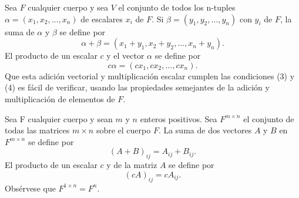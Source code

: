 \begin{ejem}
    Sea $F$ cualquier cuerpo y sea $V$ el conjunto de todos los n-tuples $\alpha=(x_1,x_2,\ldots,x_n)$ de escalares $x_i$ de $F$. Si $\beta = (y_1,y_2,\ldots , y_n)$ con $y_i$ de $F$, la suma de $\alpha$ y $\beta$ se define por
    \begin{equation}
	\alpha+\beta = (x_1+y_1,x_2+y_2,\ldots,x_n+y_n).
    \end{equation}
    El producto de un escalar $c$ y el vector $\alpha$ se define por 
    \begin{equation}
	c\alpha = (cx_1,cx_2,\ldots,cx_n).
    \end{equation}
    Que esta adición vectorial y multiplicación escalar cumplen las condiciones (3) y (4) es fácil de verificar, usando las propiedades semejantes de la adición y multiplicación de elementos de $F$.
\end{ejem}

\begin{ejem} Sea F cualquier cuerpo y sean $m$ y $n$ enteros positivos. Sea $F^{m\times n}$ el conjunto de todas las matrices $m\times n$ sobre el cuerpo $F$. La suma de dos vectores $A$ y $B$ en $F^{m\times n}$ se define por 
    \begin{equation}
	(A+B)_{ij}=A_{ij}+B_{ij}.
    \end{equation}
    El producto de un escalar $c$ y de la matriz $A$ se define por 
    \begin{equation}
	(cA)_{ij} = cA_{ij}.
    \end{equation}
    Obsérvese que $F^{1\times n}=F^n$.
\end{ejem}

